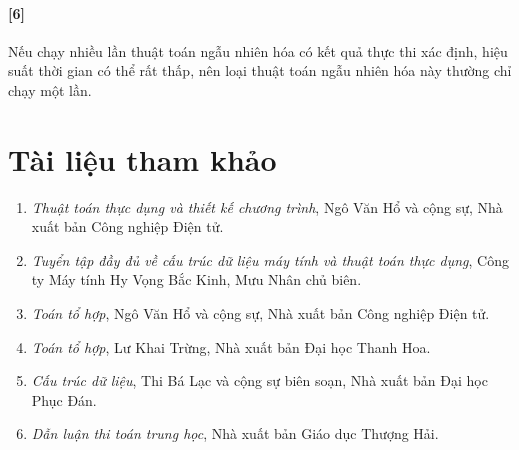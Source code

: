 \documentclass[11pt]{article}
\begin{document}
\paragraph{[6]}
Nếu chạy nhiều lần thuật toán ngẫu nhiên hóa có kết quả thực thi xác định,
hiệu suất thời gian có thể rất thấp, nên loại thuật toán ngẫu nhiên hóa này
thường chỉ chạy một lần.

\section*{Tài liệu tham khảo}

\begin{enumerate}
  \item \textit{Thuật toán thực dụng và thiết kế chương trình}, Ngô Văn Hổ và
  cộng sự, Nhà xuất bản Công nghiệp Điện tử.
  \item \textit{Tuyển tập đầy đủ về cấu trúc dữ liệu máy tính và thuật toán
  thực dụng}, Công ty Máy tính Hy Vọng Bắc Kinh, Mưu Nhân chủ biên.
  \item \textit{Toán tổ hợp}, Ngô Văn Hổ và cộng sự, Nhà xuất bản Công nghiệp
  Điện tử.
  \item \textit{Toán tổ hợp}, Lư Khai Trừng, Nhà xuất bản Đại học Thanh Hoa.
  \item \textit{Cấu trúc dữ liệu}, Thi Bá Lạc và cộng sự biên soạn, Nhà xuất
  bản Đại học Phục Đán.
  \item \textit{Dẫn luận thi toán trung học}, Nhà xuất bản Giáo dục Thượng Hải.
\end{enumerate}
\end{document}
